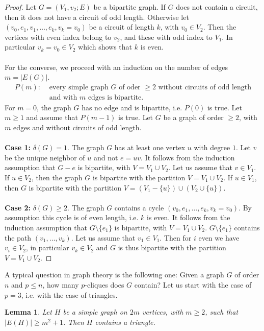 \documentclass[12pt,a4paper]{article}
\newtheorem{lem}{Lemma}[section]
\theoremstyle{definition}
\begin{document}
\begin{proof}
Let $G=(V_1,v_2;E)$ be a bipartite graph. If $G$ does not contain a circuit, then it does not have a circuit of odd length. Otherwise let $(v_0,e_1,v_1, \dots , e_k,v_k=v_0)$ be a circuit of length $k$, with $v_0 \in V_2$. Then the vertices with even index belong to $v_2$, and these with odd index to $V_1$. In particular $v_k= v_0 \in V_2$ which shows that $k$ is even. \\
\\
For the converse, we proceed with an induction on the number of edges $m= |E(G)|$. 
\begin{align*}
P(m) : &\text{ every simple graph $G$ of oder $\geq$2 without circuits of odd length} \\
& \text{ and with $m$ edges is bipartite.}
\end{align*}
For $m=0$, the graph $G$ has no edge and is bipartite, i.e. $P(0)$ is true. Let $m \geq 1$ and assume that $P(m-1)$ is true. Let $G$ be a graph of order $\geq 2$, with $m$ edges and without circuits of odd length.
\\\\
\textbf{Case 1:} $\delta(G)=1$. The graph $G$ has at least one vertex $u$ with degree $1$. Let $v$ be the unique neighbor of $u$ and not $e=uv$. It follows from the induction assumption that $G-e$ is bipartite, with $V=V_1 \cup V_2$. Let us assume that $v \in V_1$. If $u \in V_2$, then the graph $G$ is bipartite with the partition $V= V_1 \cup V_2$. If $u \in V_1$, then $G$ is bipartite with the partition $V= (V_1- \{u\}) \cup (V_2 \cup \{u\})$. 
\\\\
\textbf{Case 2:} $\delta(G) \geq 2$. The graph $G$ contains a cycle $(v_0,e_1, \dots , e_k, v_k= v_0)$. By assumption this cycle is of even length, i.e. $k$ is even. It follows from the induction assumption that $G \setminus \{e_1\}$ is bipartite, with $V= V_1 \cup V_2$. $G \setminus \{e_1\}$ contains the path $(v_1, \dots , v_k)$. Let us assume that $v_1 \in V_1$. Then for $i$ even we have $v_i \in V_2$, in particular $v_k \in V_2$ and $G$ is thus bipartite with the partition $V=V_1 \cup V_2$. 
\end{proof}
A typical question in graph theory is the following one: Given a graph $G$ of order $n$ and $p \leq n$, how many $p$-cliques does $G$ contain? Let us start with the case of $p=3$, i.e. with the case of triangles.
\begin{lem} \label{lem1} Let $H$ be a simple graph on $2m$ vertices, with $m \geq 2$, such that $|E(H)| \geq m^2+1$. Then $H$ contains a triangle. 
\end{lem}
\end{document}
